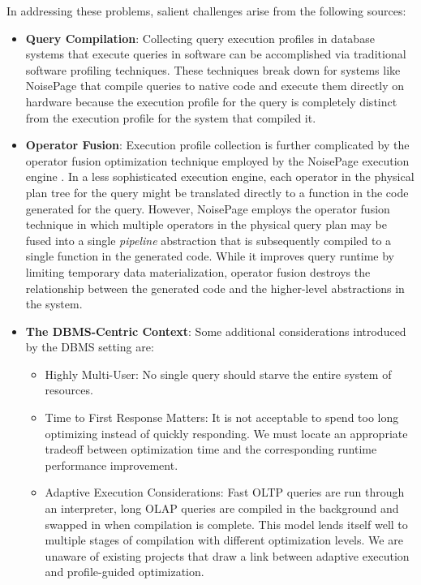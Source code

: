 \documentclass{vldb}
\begin{document}
In addressing these problems, salient challenges arise from the following sources:

\begin{itemize}
    \item \textbf{Query Compilation}: Collecting query execution profiles in database systems that execute queries in software can be accomplished via traditional software profiling techniques. These techniques break down for systems like NoisePage that compile queries to native code and execute them directly on hardware because the execution profile for the query is completely distinct from the execution profile for the system that compiled it.
    \item \textbf{Operator Fusion}: Execution profile collection is further complicated by the operator fusion optimization technique employed by the NoisePage execution engine \cite{menon18}. In a less sophisticated execution engine, each operator in the physical plan tree for the query might be translated directly to a function in the code generated for the query. However, NoisePage employs the operator fusion technique in which multiple operators in the physical query plan may be fused into a single \textit{pipeline} abstraction that is subsequently compiled to a single function in the generated code. While it improves query runtime by limiting temporary data materialization, operator fusion destroys the relationship between the generated code and the higher-level abstractions in the system.
    \item \textbf{The DBMS-Centric Context}: Some additional considerations introduced by the DBMS setting are:
    \begin{itemize}
        \item Highly Multi-User: No single query should starve the entire system of resources.
        \item Time to First Response Matters: It is not acceptable to spend too long optimizing instead of quickly responding. We must locate an appropriate tradeoff between optimization time and the corresponding runtime performance improvement.
        \item Adaptive Execution Considerations: Fast OLTP queries are run through an interpreter, long OLAP queries are compiled in the background and swapped in when compilation is complete. This model lends itself well to multiple stages of compilation with different optimization levels. We are unaware of existing projects that draw a link between adaptive execution and profile-guided optimization.
    \end{itemize}
\end{itemize}
\end{document}

